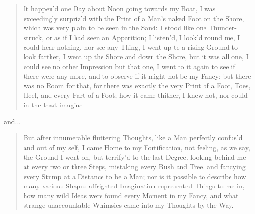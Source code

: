 \documentclass[a4paper]{article}
\begin{document}
\noindent
\begin{minipage}{1\textwidth}
\vspace{1em}
\begin{quotation}
{\ttfamily

It happen’d one Day about Noon going towards my Boat, I was exceedingly surpriz’d with the Print of a Man’s naked Foot on the Shore, which was very plain to be seen in the Sand: I stood like one Thunder-struck, or as if I had seen an Apparition; I listen’d, I look’d round me, I could hear nothing, nor see any Thing, I went up to a rising Ground to look farther, I went up the Shore and down the Shore, but it was all one, I could see no other Impression but that one, I went to it again to see if there were any more, and to observe if it might not be my Fancy; but there was no Room for that, for there was exactly the very Print of a Foot, Toes, Heel, and every Part of a Foot; how it came thither, I knew not, nor could in the least imagine.


}
\end{quotation}
\vspace{1em}
\end{minipage}

and...

\noindent
\begin{minipage}{1\textwidth}
\vspace{1em}
\begin{quotation}
{\ttfamily


But after innumerable fluttering Thoughts, like a Man perfectly confus’d and out of my self, I came Home to my Fortification, not feeling, as we say, the Ground I went on, but terrify’d to the last Degree, looking behind me at every two or three Steps, mistaking every Bush and Tree, and fancying every Stump at a Distance to be a Man; nor is it possible to describe how many various Shapes affrighted Imagination represented Things to me in, how many wild Ideas were found every Moment in my Fancy, and what strange unaccountable Whimsies came into my Thoughts by the Way.


}
\end{quotation}
\vspace{1em}
\end{minipage}
\end{document}
